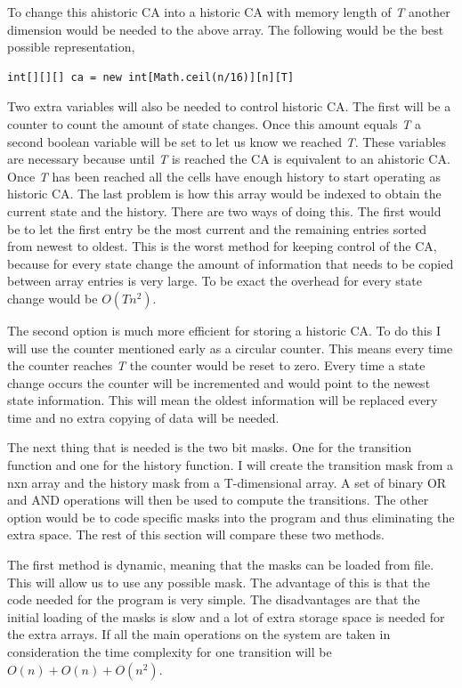 \documentclass[a4paper,11pt,titlepage]{article}
\begin{document}
To change this ahistoric CA into a historic CA with memory length of \emph{T} another dimension would be needed to the above array. The following would be the best possible representation,
\begin{verbatim}
int[][][] ca = new int[Math.ceil(n/16)][n][T]
\end{verbatim}
Two extra variables will also be needed to control historic CA. The first will be a counter to count the amount of state changes. Once this amount equals \emph{T} a second boolean variable will be set to let us know we reached \emph{T}. These variables are necessary because until \emph{T} is reached the CA is equivalent to an ahistoric CA. Once \emph{T} has been reached all the cells have enough history to start operating as historic CA. The last problem is how this array would be indexed to obtain the current state and the history. There are two ways of doing this. The first would be to let the first entry be the most current and the remaining entries sorted from newest to oldest. This is the worst method for keeping control of the CA, because for every state change the amount of information that needs to be copied between array entries is very large. To be exact the overhead for every state change would be \emph{$O(Tn^2)$}.

The second option is much more efficient for storing a historic CA. To do this I will use the counter mentioned early as a circular counter. This means every time the counter reaches \emph{T} the counter would be reset to zero. Every time a state change occurs the counter will be incremented and would point to the newest state information. This will mean the oldest information will be replaced every time and no extra copying of data will be needed.

The next thing that is needed is the two bit masks. One for the transition function and one for the history function. I will create the transition mask from a nxn array and the history mask from a T-dimensional array. A set of binary OR and AND operations will then be used to compute the transitions. The other option would be to code specific masks into the program and thus eliminating the extra space. The rest of this section will compare these two methods.

The first method is dynamic, meaning that the masks can be loaded from file. This will allow us to use any possible mask. The advantage of this is that the code needed for the program is very simple. The disadvantages are that the initial loading of the masks is slow and a lot of extra storage space is needed for the extra arrays. If all the main operations on the system are taken in consideration the time complexity for one transition will be $O(n)+O(n)+O(n^2)$.
\end{document}
